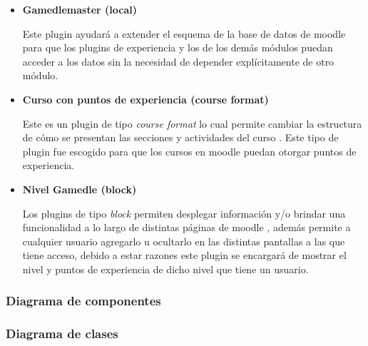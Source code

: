     \begin{itemize}
    \item {\bf\color{primary}%
    \hypertarget{local:gamedlemaster}{Gamedlemaster} (local)}

        Este plugin ayudará a extender el esquema de la base de datos de moodle
        para que los plugins de experiencia y los de los demás módulos puedan
        acceder a los datos sin la necesidad de depender explícitamente de otro
        módulo.

    \item {\bf\color{primary}%
    \hypertarget{format:gamedle}{Curso con puntos de experiencia} (course format)}

        Este es un plugin de tipo {\it course format} lo cual permite cambiar
        la estructura de cómo se presentan las secciones y actividades del curso
        \cite{MoodleCourseFormat}. Este tipo de plugin fue escogido para que los
        cursos en moodle puedan otorgar puntos de experiencia.

    \item {\bf\color{primary}%
    \hypertarget{block:gmxp}{Nivel Gamedle} (block)}

        Los plugins de tipo {\it block} permiten desplegar información y/o brindar una 
        funcionalidad a lo largo de distintas páginas de moodle \cite{MoodleBlocks},
        además permite a cualquier usuario agregarlo u ocultarlo en las distintas
        pantallas a las que tiene acceso, debido a estar razones este plugin se
        encargará de mostrar el nivel y puntos de experiencia de dicho nivel que
        tiene un usuario.
    \end{itemize}

\subsubsection{Diagrama de componentes} %
\subsubsection{Diagrama de clases} %
